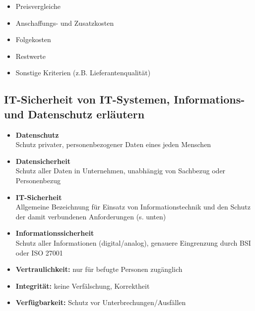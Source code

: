     \begin{tcolorbox}[width=11cm, center, title=Wirtschaftlichkeitsbetrachtungskriterien, coltitle=white, colframe=white!20!blue, colback=white!80!blue]
        \begin{itemize}[itemsep=0.01em, parsep=0.3em]
            \item Preisvergleiche
            \item Anschaffungs- und Zusatzkosten
            \item Folgekosten
            \item Restwerte
            \item Sonstige Kriterien (z.B. Lieferantenqualität)
        \end{itemize}
    \end{tcolorbox}

\subsection{IT-Sicherheit von IT-Systemen, Informations- und Datenschutz erläutern}
    \begin{subindent}
        \begin{itemize}[leftmargin=2.5cm, topsep=0.2em, itemsep=0.1em, parsep=0.3em]
            \item \textbf{Datenschutz} \\
                  Schutz privater, personenbezogener Daten eines jeden Menschen
            \item \textbf{Datensicherheit} \\
                  Schutz aller Daten in Unternehmen, unabhängig von Sachbezug oder Personenbezug
            \item \textbf{IT-Sicherheit} \\
                  Allgemeine Bezeichnung für Einsatz von Informationstechnik und den Schutz der damit verbundenen Anforderungen (s. unten)
            \item \textbf{Informationssicherheit} \\
                  Schutz aller Informationen (digital/analog), genauere Eingrenzung durch BSI oder ISO 27001
        \end{itemize}
    \end{subindent}
    \begin{tcolorbox}[width=14cm, center, title=Gemeinsame Anforderungen für Daten und Systeme, coltitle=white, colframe=orange, colback=white!60!orange]
        \begin{itemize}[itemsep=0.1em, parsep=0.3em]
            \item \textbf{Vertraulichkeit:} nur für befugte Personen zugänglich
            \item \textbf{Integrität:} keine Verfälschung, Korrektheit
            \item \textbf{Verfügbarkeit:} Schutz vor Unterbrechungen/Ausfällen
        \end{itemize}
    \end{tcolorbox}

